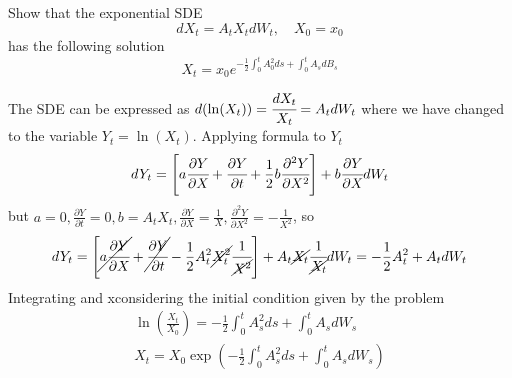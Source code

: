 \documentclass[12pt,a4paper]{exam}
\begin{document}
\begin{questions}
\question Show that the exponential SDE
\begin{equation*}
dX_t = A_t X_tdW_t,\quad X_0=x_0
\end{equation*}
has the following solution
\begin{equation*}
X_t = x_0 e^{-\frac{1}{2}\int_0^t A_0^2 ds+\int_0^t A_s dB_s}
\end{equation*}
\fillwithlines{3cm}
\begin{solution}
The SDE can be expressed as $d(\ln(X_t)) = \cfrac{dX_t}{X_t} = A_t dW_t$ where we have changed to the variable $Y_t = \ln(X_t)$. Applying \ito formula to $Y_t$ 
\begin{equation*}
dY_t = \left[a\cfrac{\partial Y}{\partial X} + \cfrac{\partial Y}{\partial t} + \frac{1}{2}b\cfrac{\partial^2 Y}{\partial X^2}\right]+ b\cfrac{\partial Y}{\partial X}dW_t
\end{equation*}
but $a=0, \frac{\partial Y}{\partial t}=0, b=A_tX_t, \frac{\partial Y}{\partial X}=\frac{1}{X}, \frac{\partial^2 Y}{\partial X^2}=-\frac{1}{X^2}$, so
\begin{equation*}
dY_t = \left[\cancel{a\cfrac{\partial Y}{\partial X}} + \cancel{\cfrac{\partial Y}{\partial t}} - \frac{1}{2}A_t^2 \cancel{X_t^2}\cfrac{1}{\cancel{X^2}}\right]+ A_t\cancel{X_t}\cfrac{1}{\cancel{X_t}}dW_t = -\frac{1}{2}A_t^2 + A_t dW_t
\end{equation*}
Integrating and xconsidering the initial condition given by the problem
\begin{equation*}
\begin{gathered}
\ln\left(\frac{X_t}{X_0}\right) = -\frac{1}{2}\int_0^t A_s^2 ds + \int_0^tA_s dW_s \\
X_t = X_0 \exp\left(-\frac{1}{2}\int_0^t A_s^2 ds + \int_0^tA_s dW_s \right)
\end{gathered}
\end{equation*}
%
%
%
%
%
%
%
%
%
%
%
%
\end{solution}


\end{questions}
\end{document}
